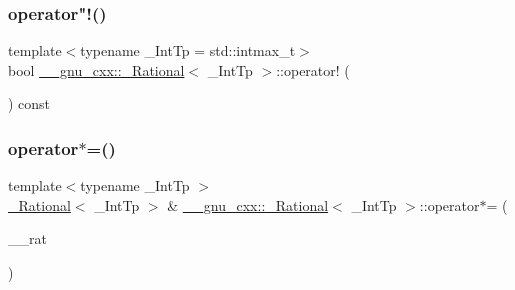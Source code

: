 \subsubsection{\texorpdfstring{operator"!()}{operator!()}}
{\footnotesize\ttfamily template$<$typename \+\_\+\+Int\+Tp = std\+::intmax\+\_\+t$>$ \\
bool \hyperlink{class____gnu__cxx_1_1__Rational}{\+\_\+\+\_\+gnu\+\_\+cxx\+::\+\_\+\+Rational}$<$ \+\_\+\+Int\+Tp $>$\+::operator! (\begin{DoxyParamCaption}{ }\end{DoxyParamCaption}) const\hspace{0.3cm}{\ttfamily [inline]}}

\mbox{\label{class____gnu__cxx_1_1__Rational_a72129abd71793dc51cfba16f948f70d7}} 
\subsubsection{\texorpdfstring{operator$\ast$=()}{operator*=()}\hspace{0.1cm}{\footnotesize\ttfamily [1/2]}}
{\footnotesize\ttfamily template$<$typename \+\_\+\+Int\+Tp $>$ \\
\hyperlink{class____gnu__cxx_1_1__Rational}{\+\_\+\+Rational}$<$ \+\_\+\+Int\+Tp $>$ \& \hyperlink{class____gnu__cxx_1_1__Rational}{\+\_\+\+\_\+gnu\+\_\+cxx\+::\+\_\+\+Rational}$<$ \+\_\+\+Int\+Tp $>$\+::operator$\ast$= (\begin{DoxyParamCaption}\item[{\hyperlink{class____gnu__cxx_1_1__Rational}{\+\_\+\+Rational}$<$ \+\_\+\+Int\+Tp $>$}]{\+\_\+\+\_\+rat }\end{DoxyParamCaption})}

\mbox{\label{class____gnu__cxx_1_1__Rational_a104dcec70f4c77c1d1ed87aba4610d61}} 
